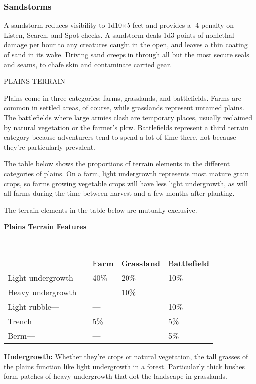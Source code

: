\documentclass{article}
\begin{document}
\subsubsection*{\textbf{Sandstorms}}

A sandstorm reduces visibility to 1d10\ensuremath{\times}5 feet and provides a 
-4 penalty on Listen, Search, and Spot checks. A sandstorm deals 1d3 points of 
nonlethal damage per hour to any creatures caught in the open, and leaves a thin 
coating of sand in its wake. Driving sand creeps in through all but the most secure 
seals and seams, to chafe skin and contaminate carried gear. 

\vspace{12pt}
PLAINS TERRAIN

Plains come in three categories: farms, grasslands, and battlefields. Farms are 
common in settled areas, of course, while grasslands represent untamed plains. 
The battlefields where large armies clash are temporary places, usually reclaimed 
by natural vegetation or the farmer's plow. Battlefields represent a third terrain 
category because adventurers tend to spend a lot of time there, not because they're 
particularly prevalent.

The table below shows the proportions of terrain elements in the different categories 
of plains. On a farm, light undergrowth represents most mature grain crops, so 
farms growing vegetable crops will have less light undergrowth, as will all farms 
during the time between harvest and a few months after planting.

The terrain elements in the table below are mutually exclusive.

\textbf{Plains Terrain Features}

\begin{tabular}{|>{\raggedright}p{78pt}|>{\raggedright}p{22pt}|>{\raggedright}p{42pt}|>{\raggedright}p{43pt}|}
\hline
 --------- & \multicolumn{3}{p{108pt}|}{ \textbf{Plains Category ---------}}\tabularnewline
\hline
  & F\textbf{arm} & G\textbf{rassland} & B\textbf{attlefield}\tabularnewline
\hline
Light undergrowth & 40\% & 20\% & 10\%\tabularnewline
\hline
Heavy undergrowth--- &  & 10\%--- & \tabularnewline
\hline
Light rubble--- & --- &  & 10\%\tabularnewline
\hline
Trench & 5\%--- &  & 5\%\tabularnewline
\hline
Berm--- & --- &  & 5\%\tabularnewline
\hline
\end{tabular}

\textbf{Undergrowth: }Whether they're crops or natural vegetation, the tall grasses 
of the plains function like light undergrowth in a forest. Particularly thick bushes 
form patches of heavy undergrowth that dot the landscape in grasslands.
\end{document}
